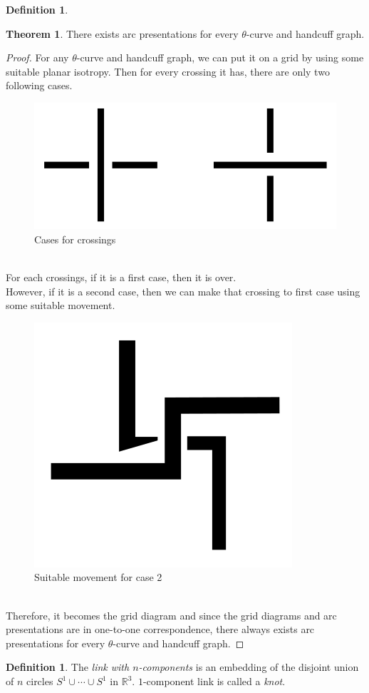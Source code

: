 \documentclass{article}
\theoremstyle{definition}
\newtheorem{defn}[thm]{Definition}
\theoremstyle{theorem}
\newtheorem{theorem}{Theorem}
\theoremstyle{proposition}
\theoremstyle{corollary}
\begin{document}
\begin{defn}
\begin{theorem}
    There exists arc presentations for every $\theta$-curve and handcuff graph. 
\end{theorem}
\begin{proof}
    For any $\theta$-curve and handcuff graph, we can put it on a grid by using some suitable planar isotropy.
    Then for every crossing it has, there are only two following cases. \\
    \begin{figure}[h]
        \centerline{\includegraphics[width=0.5\linewidth]{figure/crossings.png}}
        \caption{Cases for crossings}
        \label{figure_2}
    \end{figure}
    \\ For each crossings, if it is a first case, then it is over. \\
    However, if it is a second case, then we can make that crossing to first case using some suitable movement. \\
    \begin{figure}[h]
        \centerline{\includegraphics[width=0.25\linewidth]{figure/move crossing.png}}
        \caption{Suitable movement for case 2}
        \label{figure_2}
    \end{figure}
    \\ Therefore, it becomes the grid diagram and since the grid diagrams and arc presentations are in one-to-one correspondence, there always exists arc presentations for every $\theta$-curve and handcuff graph.
\end{proof}

\begin{defn}
    The \textit{link with $n$-components} is an embedding of the disjoint union of $n$ circles $S^1 \cup \cdots \cup S^1$ in $\mathbb{R}^3$. $1$-component link is called a \textit{knot}.
\end{defn}


\end{defn}
\end{document}
